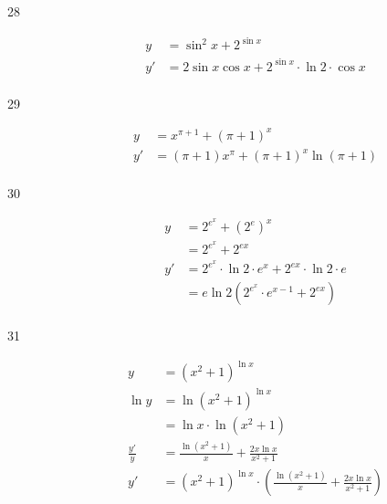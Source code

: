 \documentclass{exam}
\begin{document}
\begin{description}
\item[28]
\begin{align*}
  y &= \sin^2 x + 2^{\sin x} \\
  y' &= 2 \sin x \cos x + 2^{\sin x} \cdot \ln 2 \cdot \cos x \\
\end{align*}

\item[29]
\begin{align*}
  y &= x^{\pi + 1} + (\pi + 1)^x \\
  y' &= (\pi + 1)x^{\pi} + (\pi + 1)^x \ln(\pi + 1) \\
\end{align*}

\item[30]
\begin{align*}
  y &= 2^{e^x} + (2^e)^x \\
    &= 2^{e^x} + 2^{ex} \\
  y' &= 2^{e^x} \cdot \ln 2 \cdot e^x + 2^{ex} \cdot \ln 2 \cdot e \\
     &= e \ln 2 (2^{e^x} \cdot e^{x - 1} + 2^{ex} ) \\
\end{align*}

\item[31]
\begin{align*}
  y &= (x^2 + 1)^{\ln x} \\
  \ln y &= \ln (x^2 + 1)^{\ln x} \\ 
        &= \ln x \cdot \ln (x^2 + 1) \\
  \frac{y'}{y} &= \frac{\ln(x^2 + 1)}{x} + \frac{2x \ln x}{x^2 + 1} \\
  y' &= (x^2 + 1)^{\ln x} \cdot \left( \frac{\ln(x^2 + 1)}{x} + \frac{2x \ln x}{x^2 + 1} \right) \\
\end{align*}

\end{description}
\end{document}
